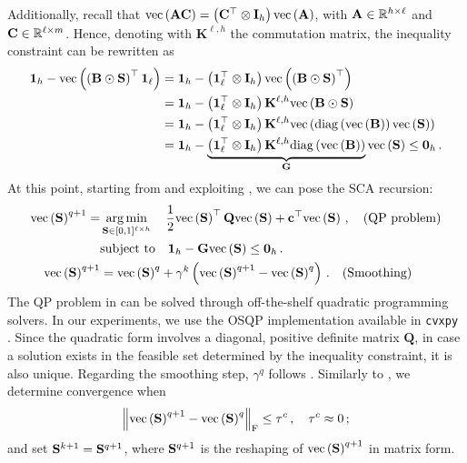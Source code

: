 Additionally, recall that $\mathrm{vec}\left(\mathbf{A} \mathbf{C}\right) = \left(\mathbf{C}^\top \otimes \mathbf{I}_h \right)\mathrm{vec}\left(\mathbf{A}\right)$, with $\mathbf{A} \in \mathbb{R}^{h\times \ell}$ and $\mathbf{C} \in \mathbb{R}^{\ell \times m}$.
Hence, denoting with $\mathbf{K}^{\ell,h}$ the commutation matrix, 
the inequality constraint can be rewritten as
\begin{equation}\label{eq:inequality_constr_S}
    \begin{aligned}
        \boldsymbol{1}_h - \mathrm{vec}\left(\left(\mathbf{B} \odot \mathbf{S}\right)^\top \boldsymbol{1}_\ell\right) &= \boldsymbol{1}_h - \left(\boldsymbol{1}_\ell^\top \otimes \mathbf{I}_h \right) \mathrm{vec}\left(\left(\mathbf{B} \odot \mathbf{S}\right)^\top\right) \\
        &= \boldsymbol{1}_h - \left(\boldsymbol{1}_\ell^\top \otimes \mathbf{I}_h \right) \mathbf{K}^{\ell,h} \mathrm{vec}\left(\mathbf{B} \odot \mathbf{S}\right) \\
        &= \boldsymbol{1}_h - \left(\boldsymbol{1}_\ell^\top \otimes \mathbf{I}_h \right) \mathbf{K}^{\ell,h} \mathrm{vec}\left(\mathrm{diag}\left(\mathrm{vec}\left(\mathbf{B}\right)\right) \mathrm{vec}\left(\mathbf{S}\right)\right)\\
        &= \boldsymbol{1}_h - \underbrace{\left(\boldsymbol{1}_\ell^\top \otimes \mathbf{I}_h \right) \mathbf{K}^{\ell,h} \mathrm{diag}\left(\mathrm{vec}\left(\mathbf{B}\right)\right)}_{\mathbf{G}} \mathrm{vec}\left(\mathbf{S}\right) \leq \boldsymbol{0}_h\,.
    \end{aligned}    
\end{equation}
At this point, starting from  and exploiting , we can pose the SCA recursion: 
\begin{equation}\label{eq:SCA_recursion_S}
    \begin{aligned}        
        \mathrm{vec}\left(\mathbf{S}\right)^{q+1} =& \operatorname*{arg\,min}_{\mathbf{S} \in [0,1]^{\ell \times h}}\quad \frac{1}{2}\mathrm{vec}\left(\mathbf{S}\right)^\top \mathbf{Q} \mathrm{vec}\left(\mathbf{S}\right) + \mathbf{c}^\top \mathrm{vec}\left(\mathbf{S}\right)\,, \quad\textrm{(QP problem)}\\
        &\textrm{subject to} \quad \boldsymbol{1}_h -  \mathbf{G} \mathrm{vec}\left(\mathbf{S}\right) \leq \boldsymbol{0}_h\,. \\
        \mathrm{vec}\left(\mathbf{S}\right)^{q+1} &= \mathrm{vec}\left(\mathbf{S}\right)^q + \gamma^k\left(\mathrm{vec}\left(\mathbf{S}\right)^{q+1}-\mathrm{vec}\left(\mathbf{S}\right)^q\right)\,. \quad\textrm{(Smoothing)}
    \end{aligned}
\end{equation}
The QP problem in  can be solved through off-the-shelf quadratic programming solvers.
In our experiments, we use the OSQP  implementation available in \texttt{cvxpy} .
Since the quadratic form involves a diagonal, positive definite matrix $\mathbf{Q}$, in case a solution exists in the feasible set determined by the inequality constraint, it is also unique.
Regarding the smoothing step, $\gamma^q$ follows .
Similarly to , we determine convergence when
\begin{equation}\label{eq:convergenceS_approx}
    \norm{\mathrm{vec}\left(\mathbf{S}\right)^{q+1}-\mathrm{vec}\left(\mathbf{S}\right)^q}_{\mathrm{F}}\leq \tau^c\,, \quad \tau^c \approx 0\,;
\end{equation}
and set $\mathbf{S}^{k+1}=\mathbf{S}^{q+1}$, where $\mathbf{S}^{q+1}$ is the reshaping of $\mathrm{vec}\left(\mathbf{S}\right)^{q+1}$ in matrix form.

